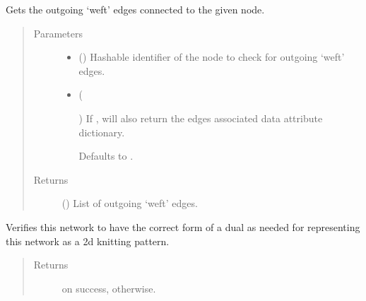 \documentclass[letterpaper,10pt,english]{sphinxmanual}
\begin{document}
\begin{fulllineitems}
\begin{fulllineitems}
\label{\detokenize{cockatoo:cockatoo.KnitDiNetwork.node_weft_edges_out}}
Gets the outgoing ‘weft’ edges connected to the given node.
\begin{quote}\begin{description}
\item[{Parameters}] \leavevmode\begin{itemize}
\item {} 
 () \textendash{} Hashable identifier of the node to check for outgoing ‘weft’ edges.

\item {} 
 (%
\begin{footnote}[154]\sphinxAtStartFootnote
{}
%
\end{footnote}\sphinxstyleliteralemphasis{\sphinxupquote{, }}) \textendash{} 
If , will also return the edges associated data attribute
dictionary.

Defaults to .


\end{itemize}

\item[{Returns}] \leavevmode
{} () \textendash{} List of outgoing ‘weft’ edges.

\end{description}\end{quote}

\end{fulllineitems}


\begin{fulllineitems}
\label{\detokenize{cockatoo:cockatoo.KnitDiNetwork.verify_dual_form}}
Verifies this network to have the correct form of a dual as needed for
representing this network as a 2d knitting pattern.
\begin{quote}\begin{description}
\item[{Returns}] \leavevmode
{} \textendash{}  on success,  otherwise.


\end{description}
\end{quote}
\end{fulllineitems}
\end{fulllineitems}
\end{document}
